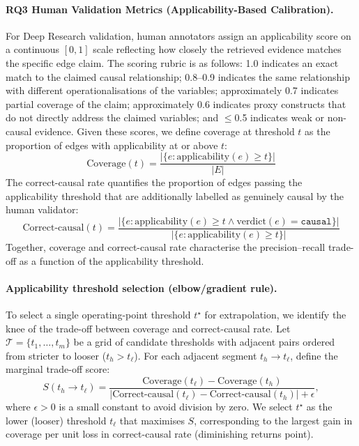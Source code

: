 \paragraph{RQ3 Human Validation Metrics (Applicability-Based Calibration).}
For Deep Research validation, human annotators assign an applicability score on a continuous $[0,1]$ scale reflecting how closely the retrieved evidence matches the specific edge claim. The scoring rubric is as follows: 1.0 indicates an exact match to the claimed causal relationship; 0.8--0.9 indicates the same relationship with different operationalisations of the variables; approximately 0.7 indicates partial coverage of the claim; approximately 0.6 indicates proxy constructs that do not directly address the claimed variables; and $\leq$0.5 indicates weak or non-causal evidence. Given these scores, we define coverage at threshold $t$ as the proportion of edges with applicability at or above $t$:
\begin{equation}
    \text{Coverage}(t) = \frac{|\{e : \text{applicability}(e) \geq t\}|}{|E|}
\end{equation}
The correct-causal rate quantifies the proportion of edges passing the applicability threshold that are additionally labelled as genuinely causal by the human validator:
\begin{equation}
    \text{Correct-causal}(t) = \frac{|\{e : \text{applicability}(e) \geq t \land \text{verdict}(e) = \texttt{causal}\}|}{|\{e : \text{applicability}(e) \geq t\}|}
\end{equation}
Together, coverage and correct-causal rate characterise the precision--recall trade-off as a function of the applicability threshold.

\paragraph{Applicability threshold selection (elbow/gradient rule).}
\label{sec:rq3_applicability_threshold_selection}
To select a single operating-point threshold \(t^\star\) for extrapolation, we identify the knee of the trade-off between coverage and correct-causal rate. Let \(\mathcal{T}=\{t_1,\dots,t_m\}\) be a grid of candidate thresholds with adjacent pairs ordered from stricter to looser (\(t_h > t_\ell\)). For each adjacent segment \(t_h \rightarrow t_\ell\), define the marginal trade-off score:
\begin{equation}
    S(t_h \rightarrow t_\ell)=\frac{\text{Coverage}(t_\ell)-\text{Coverage}(t_h)}{\left|\text{Correct-causal}(t_\ell)-\text{Correct-causal}(t_h)\right|+\epsilon},
\end{equation}
where \(\epsilon>0\) is a small constant to avoid division by zero. We select \(t^\star\) as the lower (looser) threshold \(t_\ell\) that maximises \(S\), corresponding to the largest gain in coverage per unit loss in correct-causal rate (diminishing returns point).

